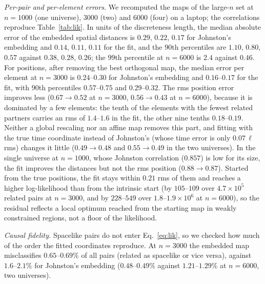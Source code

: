\documentclass[prd,twocolumn,superscriptaddress,nofootinbib,amsmath,amssymb,floatfix]{revtex4-2}
\begin{document}
\emph{Per-pair and per-element errors.} We recomputed the maps of the large-$n$ set at $n=1000$ (one universe), $3000$ (two) and $6000$ (four) on a laptop; the correlations reproduce Table~\ref{tab:lik}. In units of the discreteness length, the median absolute error of the embedded spatial distances is $0.29$, $0.22$, $0.17$ for Johnston's embedding and $0.14$, $0.11$, $0.11$ for the fit, and the $90$th percentiles are $1.10$, $0.80$, $0.57$ against $0.38$, $0.28$, $0.26$; the $99$th percentile at $n=6000$ is $2.4$ against $0.46$. For positions, after removing the best orthogonal map, the median error per element at $n=3000$ is $0.24$--$0.30$ for Johnston's embedding and $0.16$--$0.17$ for the fit, with $90$th percentiles $0.57$--$0.75$ and $0.29$--$0.32$. The rms position error improves less ($0.67\to0.52$ at $n=3000$, $0.56\to0.43$ at $n=6000$), because it is dominated by a few elements: the tenth of the elements with the fewest related partners carries an rms of $1.4$--$1.6$ in the fit, the other nine tenths $0.18$--$0.19$. Neither a global rescaling nor an affine map removes this part, and fitting with the true time coordinate instead of Johnston's (whose time error is only $0.07\,\ell$ rms) changes it little ($0.49\to0.48$ and $0.55\to0.49$ in the two universes). In the single universe at $n=1000$, whose Johnston correlation ($0.857$) is low for its size, the fit improves the distances but not the rms position ($0.88\to0.87$). Started from the true positions, the fit stays within $0.21$ rms of them and reaches a higher log-likelihood than from the intrinsic start (by $105$--$109$ over $4.7\times10^5$ related pairs at $n=3000$, and by $228$--$549$ over $1.8$--$1.9\times10^6$ at $n=6000$), so the residual reflects a local optimum reached from the starting map in weakly constrained regions, not a floor of the likelihood.

\emph{Causal fidelity.} Spacelike pairs do not enter Eq.~\eqref{eq:lik}, so we checked how much of the order the fitted coordinates reproduce. At $n=3000$ the embedded map misclassifies $0.65$--$0.69\%$ of all pairs (related as spacelike or vice versa), against $1.6$--$2.1\%$ for Johnston's embedding ($0.48$--$0.49\%$ against $1.21$--$1.29\%$ at $n=6000$, two universes).
\end{document}
